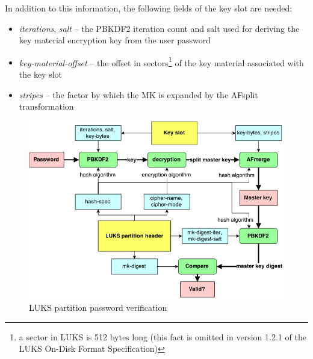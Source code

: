 \documentclass[12pt,oneside]{fithesis2}
\begin{document}
      In addition to this information, the following fields of the key slot are needed:
      \begin{itemize}
        \item \emph{iterations}, \emph{salt} -- the PBKDF2 iteration count and salt used for deriving the key material encryption key from the user password
        \item \emph{key-material-offset} -- the offset in sectors\footnote{a sector in LUKS is 512 bytes long (this fact is omitted in version 1.2.1 of the LUKS On-Disk Format Specification)} of the key material associated with the key slot
        \item \emph{stripes} -- the factor by which the MK is expanded by the AFsplit transformation
      \end{itemize}
      
      \begin{figure}[t]
        \centering
        \includegraphics[width=\linewidth]{images/luks-pwcheck.png}
        \caption{LUKS partition password verification}
      \end{figure}
      
\end{document}
